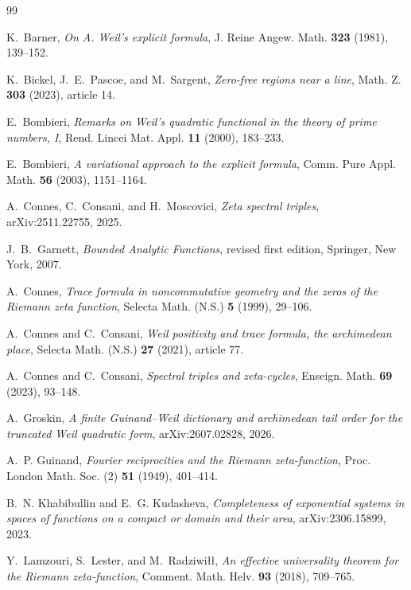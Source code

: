 \documentclass[11pt]{article}
\begin{document}
\begin{thebibliography}{99}

K.~Barner,
\emph{On A. Weil's explicit formula},
J. Reine Angew. Math. \textbf{323} (1981), 139--152.

K.~Bickel, J.~E.~Pascoe, and M.~Sargent,
\emph{Zero-free regions near a line},
Math. Z. \textbf{303} (2023), article 14.

E.~Bombieri,
\emph{Remarks on Weil's quadratic functional in the theory of prime numbers, I},
Rend. Lincei Mat. Appl. \textbf{11} (2000), 183--233.

E.~Bombieri,
\emph{A variational approach to the explicit formula},
Comm. Pure Appl. Math. \textbf{56} (2003), 1151--1164.

A.~Connes, C.~Consani, and H.~Moscovici,
\emph{Zeta spectral triples},
arXiv:2511.22755, 2025.

J.~B.~Garnett,
\emph{Bounded Analytic Functions}, revised first edition,
Springer, New York, 2007.

A.~Connes,
\emph{Trace formula in noncommutative geometry and the zeros of the Riemann zeta function},
Selecta Math. (N.S.) \textbf{5} (1999), 29--106.

A.~Connes and C.~Consani,
\emph{Weil positivity and trace formula, the archimedean place},
Selecta Math. (N.S.) \textbf{27} (2021), article 77.

A.~Connes and C.~Consani,
\emph{Spectral triples and zeta-cycles},
Enseign. Math. \textbf{69} (2023), 93--148.

A.~Groskin,
\emph{A finite Guinand--Weil dictionary and archimedean tail order for the truncated Weil
quadratic form},
arXiv:2607.02828, 2026.

A.~P. Guinand,
\emph{Fourier reciprocities and the Riemann zeta-function},
Proc. London Math. Soc. (2) \textbf{51} (1949), 401--414.

B.~N. Khabibullin and E.~G. Kudasheva,
\emph{Completeness of exponential systems in spaces of functions on a compact or domain and
their area},
arXiv:2306.15899, 2023.

Y.~Lamzouri, S.~Lester, and M.~Radziwi{\l}{\l},
\emph{An effective universality theorem for the Riemann zeta-function},
Comment. Math. Helv. \textbf{93} (2018), 709--765.


\end{thebibliography}
\end{document}
